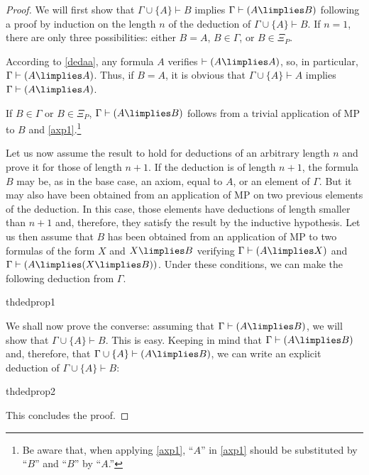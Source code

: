 \begin{proof}

We will first show that $\Gamma \cup \{A\} \vdash B$ implies $\Gamma \vdash (A\limplies B)$ following a proof by induction on the length $n$ of the deduction of $\Gamma\cup\{A\}\vdash B$.
If $n = 1$, there are only three possibilities: either $B = A$, $B\in \Gamma$, or $B\in \Xi_P$. 

According to \ref{dedaa}, any formula $A$ verifies $\vdash (A\limplies A)$, so, in particular, $\Gamma \vdash (A\limplies A)$.
Thus, if $B = A$, it is obvious that $\Gamma\cup\{A\}\vdash A$ implies $\Gamma \vdash (A\limplies A)$. 

If $B\in \Gamma$ or $B\in \Xi_P$, $\Gamma \vdash (A\limplies B)$ follows from a trivial application of MP to $B$ and \ref{axp1}.\footnote{Be aware that, when applying \ref{axp1}, ``$A$'' in \ref{axp1} should be substituted by ``$B$'' and ``$B$'' by ``$A$.''}

Let us now assume the result to hold for deductions of an arbitrary length $n$ and prove it for those of length $n+1$.
If the deduction is of length $n+1$, the formula $B$ may be, as in the base case, an axiom, equal to $A$, or an element of $\Gamma$.
But it may also have been obtained from an application of MP on two previous elements of the deduction.
In this case, those elements have deductions of length smaller than $n+1$ and, therefore, they satisfy the result by the inductive hypothesis. Let us then assume that $B$ has been obtained from an application of MP to two formulas of the form $X$ and $X\limplies B$ verifying $\Gamma \vdash (A\limplies X)$ and $\Gamma \vdash (A\limplies(X \limplies B))$. Under these conditions, we can make the following deduction from $\Gamma$.

\begin{deduction}{thdedprop1}
\end{deduction}

We shall now prove the converse: assuming that $\Gamma \vdash (A\limplies B)$, we will show that $\Gamma\cup \{A\} \vdash B$.
This is easy. Keeping in mind that $\Gamma \vdash (A\limplies B)$ and, therefore, that $\Gamma\cup\{A\}\vdash (A\limplies B)$, we can write an explicit deduction of $\Gamma\cup\{A\}\vdash B$:
\begin{deduction}{thdedprop2}
\end{deduction}
This concludes the proof.
\end{proof}

